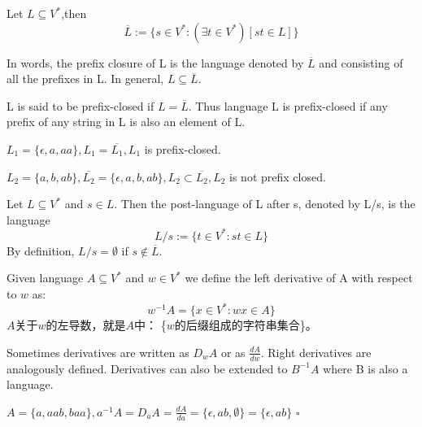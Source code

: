 \begin{definition}
	Let $L\subseteq V^*$,then
	$$\overline{L} := \{s\in V^*:(\exists t\in V^*)[st\in L]\}$$
\end{definition}
In words, the prefix closure of L is the language denoted by $\overline{L}$ and consisting of all the prefixes in L. In general, $L\subseteq \overline{L}$.

L is said to be prefix-closed if $L = \overline{L}$. Thus language L is prefix-closed if any prefix of any string in L is also an element of L.

$L_1 = \{\epsilon,a,aa\}, L_1 = \overline{L_1}, L_{1}$ is prefix-closed.

$L_2 = \{a,b,ab\}, \overline{L_2} = \{\epsilon,a,b,ab\}, L_2 \subset \overline{L_2}, L_2$ is not prefix closed.

\hfill

\begin{definition}
Let $L\subseteq V^{\ast}$ and $s\in L$. Then the post-language of L after s, denoted by L/s, is the language
$$ L/s := \{t\in V^{\ast}:st\in L\}$$
By definition, $L/s = \emptyset$ if $s \notin \overline{L}$.
\end{definition}

\hfill

\begin{definition} Given language $A\subseteq V^{\ast}$ and $w\in V^{\ast}$ we define the left derivative of A with respect to $w$ as:
$$w^{-1}A = \{x\in V^{\ast}:wx\in A\}$$
$A$关于$w$的左导数，就是$A$中： \{$w$的后缀组成的字符串集合\}。

Sometimes derivatives are written as $D_{w}A$ or as $\frac{dA}{dw}$. Right derivatives are analogously defined. Derivatives can also be extended to $B^{-1}A$ where B is also a language.
\end{definition}

\begin{example}
$A = \{a,aab,baa\},a^{-1}A = D_{a}A = \frac{dA}{da} =\{\epsilon,ab,\emptyset\} = \{\epsilon,ab\}$ \hfill$\square$
\end{example}


